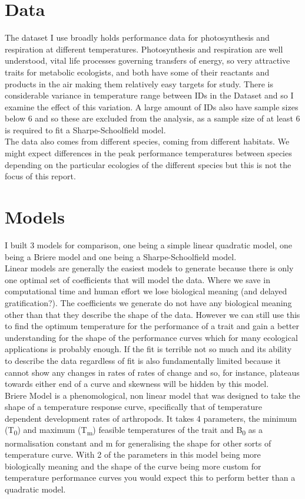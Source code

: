 \documentclass[fontsize=11pt]{scrartcl}\usepackage[]{graphicx}\usepackage[]{color}
\begin{document}
  \section{Data}
  The dataset I use broadly holds performance data for photosynthesis and respiration at different temperatures. 
  Photosynthesis and respiration are well understood, vital life processes governing transfers of energy, so very attractive traits for metabolic ecologists,
  and both have some of their reactants and products in the air making them relatively easy targets for study. There is considerable variance 
  in temperature range between IDs in the Dataset and so I examine the effect of this variation. 
  A large amount of IDs also have sample sizes below 6 
  and so these are excluded from the analysis, as a sample size of at least 6 is required to fit a Sharpe-Schoolfield model. \\
  The data also comes from different species, coming from different habitats. We might expect differences in the peak performance 
  temperatures between species depending on the particular ecologies of the different species but this is not the focus 
  of this report. \\
 
  \section{Models}
  I built 3 models for comparison, one being a simple linear quadratic model, one being a Briere model and one being a Sharpe-Schoolfield model.\\
  Linear models are generally the easiest models to generate because there is only one optimal set of coefficients that will model the data. 
  Where we save in computational time and human effort we lose biological meaning (and delayed gratification?). The coefficients we generate 
  do not have any biological meaning other than that they describe the shape of the data. However we can still use this to find the optimum 
  temperature for the performance of a trait and gain a better understanding for the shape of the performance curves which for many ecological 
  applications is probably enough. If the fit is terrible not so much and its ability to describe the data regardless of fit is also 
  fundamentally limited because it cannot show any changes in rates of rates of change and so, for instance, plateaus towards either end of a 
  curve and skewness will be hidden by this model.\\
  Briere Model \cite{Brierea} is a phenomological, non linear model that was designed to take the shape of a temperature response curve, 
  specifically that of temperature dependent development rates of arthropods. It takes 4 parameters, the minimum (T\textsubscript{0}) and maximum (T\textsubscript{m}) 
  feasible temperatures of the trait and B\textsubscript{0} as a normalisation constant and m for generalising the shape for other sorts of temperature
  curve. With 2 of the parameters in this model being more biologically meaning and the shape of the curve being more custom for temperature
  performance curves you would expect this to perform better than a quadratic model.\\
\end{document}
